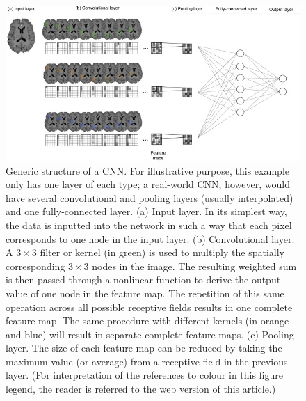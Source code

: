 \documentclass[final, paper=letter,5p,times,twocolumn]{elsarticle}
\begin{document}
\begin{figure}[htbp]
   \begin{center}
      \includegraphics[scale=1., angle=0]{images/1-s2_0-S0149763416305176-gr4.jpg}
   \end{center}
   \caption{Generic structure of a CNN. For illustrative purpose, this example only has one layer of each type; a real-world CNN, however, would have several convolutional and pooling layers (usually interpolated) and one fully-connected layer. (a) Input layer. In its simplest way, the data is inputted into the network in such a way that each pixel corresponds to one node in the input layer. (b) Convolutional layer. A $3 \times 3$ filter or kernel (in green) is used to multiply the spatially corresponding $3 \times 3$ nodes in the image. The resulting weighted sum is then passed through a nonlinear function to derive the output value of one node in the feature map. The repetition of this same operation across all possible receptive fields results in one complete feature map. The same procedure with different kernels (in orange and blue) will result in separate complete feature maps. (c) Pooling layer. The size of each feature map can be reduced by taking the maximum value (or average) from a receptive field in the previous layer. (For interpretation of the references to colour in this figure legend, the reader is referred to the web version of this article.)}
  \label{fig:features_maps} 
\end{figure}
\end{document}
